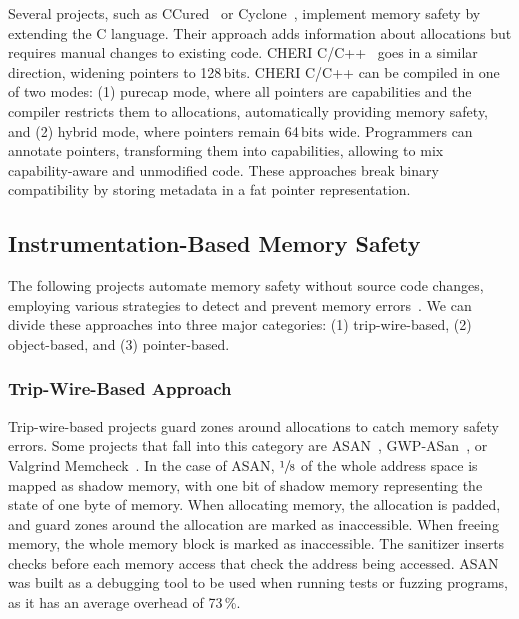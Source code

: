 Several projects, such as CCured~\cite{necula2002ccured} or Cyclone~\cite{jim2002cyclone}, implement memory safety by extending the C language.
Their approach adds information about allocations but requires manual changes to existing code.
CHERI C/C++~\cite{watson_cheri_2020} goes in a similar direction, widening pointers to 128\,bits.
CHERI C/C++ can be compiled in one of two modes: (1) purecap mode, where all pointers are capabilities and the compiler restricts them to allocations, automatically providing memory safety, and (2) hybrid mode, where pointers remain 64\,bits wide.
Programmers can annotate pointers, transforming them into capabilities, allowing to mix capability-aware and unmodified code.
These approaches break binary compatibility by storing metadata in a fat pointer representation.

\subsection{Instrumentation-Based Memory Safety}
\label{subsec:automatic-approaches}

The following projects automate memory safety without source code changes, employing various strategies to detect and prevent memory errors~\cite{serebryany2012addresssanitizer,serebryany2023gwp,nethercote2007valgrind}.
We can divide these approaches into three major categories: (1) trip-wire-based, (2) object-based, and (3) pointer-based.

\subsubsection{Trip-Wire-Based Approach}

Trip-wire-based projects guard zones around allocations to catch memory safety errors.
Some projects that fall into this category are \ac{ASAN}~\cite{serebryany2012addresssanitizer}, GWP-ASan~\cite{serebryany2023gwp}, or Valgrind Memcheck~\cite{nethercote2007valgrind}.
In the case of \ac{ASAN}, $\sfrac{1}{8}$ of the whole address space is mapped as shadow memory, with one bit of shadow memory representing the state of one byte of memory.
When allocating memory, the allocation is padded, and guard zones around the allocation are marked as inaccessible.
When freeing memory, the whole memory block is marked as inaccessible.
The sanitizer inserts checks before each memory access that check the address being accessed.
\Ac{ASAN} was built as a debugging tool to be used when running tests or fuzzing programs, as it has an average overhead of 73\,\%.

